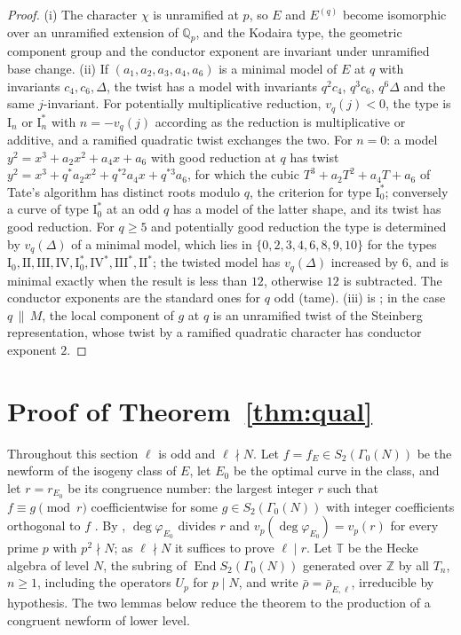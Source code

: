 \documentclass[11pt]{amsart}
\theoremstyle{definition}
\newcommand{\Q}{\mathbb{Q}}
\newcommand{\Z}{\mathbb{Z}}
\begin{document}
\begin{proof}
(i) The character $\chi$ is unramified at $p$, so $E$ and $E^{(q)}$ become isomorphic over an unramified extension of $\Q_p$, and the Kodaira type, the geometric component group and the conductor exponent are invariant under unramified base change. (ii) If $(a_1,a_2,a_3,a_4,a_6)$ is a minimal model of $E$ at $q$ with invariants $c_4,c_6,\Delta$, the twist has a model with invariants $q^{2}c_4$, $q^{3}c_6$, $q^{6}\Delta$ and the same $j$-invariant. For potentially multiplicative reduction, $v_q(j)<0$, the type is $\mathrm{I}_n$ or $\mathrm{I}_n^*$ with $n=-v_q(j)$ according as the reduction is multiplicative or additive, and a ramified quadratic twist exchanges the two. For $n=0$: a model $y^2=x^3+a_2x^2+a_4x+a_6$ with good reduction at $q$ has twist $y^2=x^3+q^*a_2x^2+q^{*2}a_4x+q^{*3}a_6$, for which the cubic $T^3+a_2T^2+a_4T+a_6$ of Tate's algorithm has distinct roots modulo $q$, the criterion for type $\mathrm{I}_0^*$; conversely a curve of type $\mathrm{I}_0^*$ at an odd $q$ has a model of the latter shape, and its twist has good reduction. For $q\ge5$ and potentially good reduction the type is determined by $v_q(\Delta)$ of a minimal model, which lies in $\{0,2,3,4,6,8,9,10\}$ for the types $\mathrm{I}_0,\mathrm{II},\mathrm{III},\mathrm{IV},\mathrm{I}_0^*,\mathrm{IV}^*,\mathrm{III}^*,\mathrm{II}^*$; the twisted model has $v_q(\Delta)$ increased by $6$, and is minimal exactly when the result is less than $12$, otherwise $12$ is subtracted. The conductor exponents are the standard ones for $q$ odd (tame). (iii) is \cite[Theorem 3.1]{AtkinLi78}; in the case $q\,\|\,M$, the local component of $g$ at $q$ is an unramified twist of the Steinberg representation, whose twist by a ramified quadratic character has conductor exponent $2$.
\end{proof}

\section{Proof of Theorem~\ref{thm:qual}}\label{sec:proof}

Throughout this section $\ell$ is odd and $\ell\nmid N$. Let $f=f_E\in S_2(\Gamma_0(N))$ be the newform of the isogeny class of $E$, let $E_0$ be the optimal curve in the class, and let $r=r_{E_0}$ be its congruence number: the largest integer $r$ such that $f\equiv g\pmod r$ coefficientwise for some $g\in S_2(\Gamma_0(N))$ with integer coefficients orthogonal to $f$ \cite[\S2]{ARS12}. By \cite[Theorem 2.2]{ARS12}, $\deg\varphi_{E_0}$ divides $r$ and $v_p(\deg\varphi_{E_0})=v_p(r)$ for every prime $p$ with $p^2\nmid N$; as $\ell\nmid N$ it suffices to prove $\ell\mid r$. Let $\mathbb{T}$ be the Hecke algebra of level $N$, the subring of $\operatorname{End}S_2(\Gamma_0(N))$ generated over $\Z$ by all $T_n$, $n\ge1$, including the operators $U_p$ for $p\mid N$, and write $\bar\rho=\bar\rho_{E,\ell}$, irreducible by hypothesis. The two lemmas below reduce the theorem to the production of a congruent newform of lower level.
\end{document}
